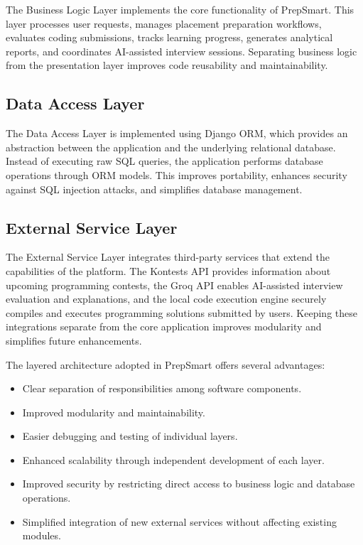 The Business Logic Layer implements the core functionality of PrepSmart. This layer processes user requests, manages placement preparation workflows, evaluates coding submissions, tracks learning progress, generates analytical reports, and coordinates AI-assisted interview sessions. Separating business logic from the presentation layer improves code reusability and maintainability.

\subsection{Data Access Layer}

The Data Access Layer is implemented using Django ORM, which provides an abstraction between the application and the underlying relational database. Instead of executing raw SQL queries, the application performs database operations through ORM models. This improves portability, enhances security against SQL injection attacks, and simplifies database management.

\subsection{External Service Layer}

The External Service Layer integrates third-party services that extend the capabilities of the platform. The Kontests API provides information about upcoming programming contests, the Groq API enables AI-assisted interview evaluation and explanations, and the local code execution engine securely compiles and executes programming solutions submitted by users. Keeping these integrations separate from the core application improves modularity and simplifies future enhancements.

The layered architecture adopted in PrepSmart offers several advantages:

\begin{itemize}
\item Clear separation of responsibilities among software components.
\item Improved modularity and maintainability.
\item Easier debugging and testing of individual layers.
\item Enhanced scalability through independent development of each layer.
\item Improved security by restricting direct access to business logic and database operations.
\item Simplified integration of new external services without affecting existing modules.
\end{itemize}

